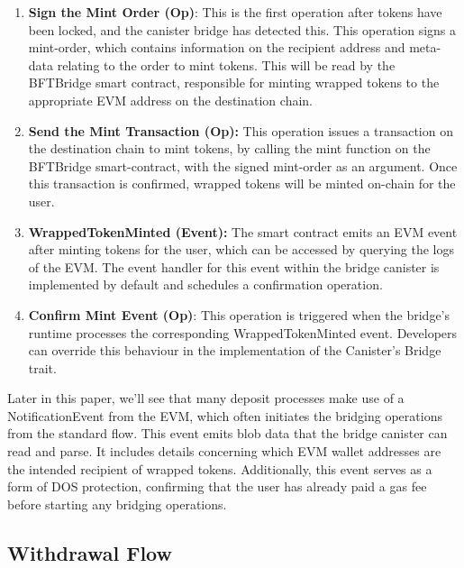 \documentclass{article}
\begin{document}
\begin{enumerate}
        
        \item\textbf{Sign the Mint Order (Op)}: This is the first operation after tokens have been locked, and the canister bridge has detected this. This operation signs a mint-order, which contains information on the recipient address and meta-data relating to the order to mint tokens. This will be read by the BFTBridge smart contract, responsible for minting wrapped tokens to the appropriate EVM address on the destination chain.
        
        \item \textbf{Send the Mint Transaction (Op):} This operation issues a transaction on the destination chain to mint tokens, by calling the mint function on the BFTBridge smart-contract, with the signed mint-order as an argument. Once this transaction is confirmed, wrapped tokens will be minted on-chain for the user.
        
        \item{\textbf{WrappedTokenMinted (Event):}} The smart contract emits an EVM event after minting tokens for the user, which can be accessed by querying the logs of the EVM. The event handler for this event within the bridge canister is implemented by default and schedules a confirmation operation.

        
        \item \textbf{Confirm Mint Event (Op)}: This operation is triggered when the bridge's runtime processes the corresponding WrappedTokenMinted event. Developers can override this behaviour in the implementation of the Canister's Bridge trait.
        
    \end{enumerate}


Later in this paper, we'll see that many deposit processes make use of a NotificationEvent from the EVM, which often initiates the bridging operations  from the standard flow. This event emits blob data that the bridge canister can read and parse. It includes details concerning which EVM wallet addresses are the intended recipient of wrapped tokens. Additionally, this event serves as a form of DOS protection, confirming that the user has already paid a gas fee before starting any bridging operations.







\subsection{Withdrawal Flow}
\end{document}
